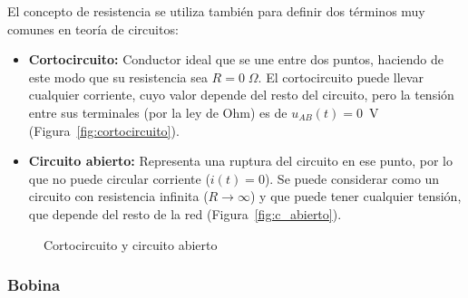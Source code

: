 	El concepto de resistencia se utiliza también para definir dos
        términos muy comunes en teoría de circuitos:
	\begin{itemize}
        \item \textbf{Cortocircuito:} Conductor ideal que se une entre
          dos puntos, haciendo de este modo que su resistencia sea
          $R=0\;\Omega$. El cortocircuito puede llevar cualquier
          corriente, cuyo valor depende del resto del circuito, pero
          la tensión entre sus terminales (por la ley de Ohm) es de
          $u_{AB}(t)=0$~V (Figura~\ref{fig:cortocircuito}).
        \item \textbf{Circuito abierto:} Representa una ruptura del
          circuito en ese punto, por lo que no puede circular
          corriente ($i(t)=0$). Se puede considerar como un circuito
          con resistencia infinita ($R\rightarrow\infty$) y que puede
          tener cualquier tensión, que depende del resto de la red
          (Figura~\ref{fig:c_abierto}).
	\end{itemize}
	\begin{figure}[H]
          \centering
          \hfil
          \caption{Cortocircuito y circuito abierto}
		
	\end{figure}
	
	\subsubsection{Bobina}\label{sec.bobina}
	
